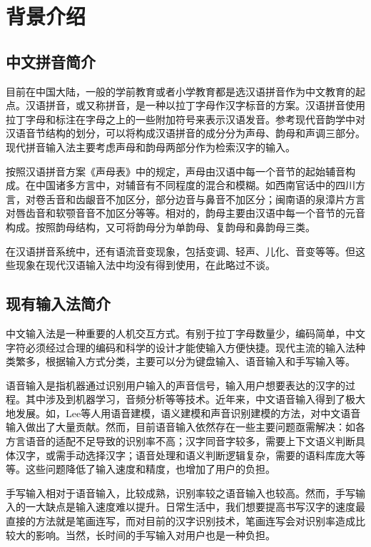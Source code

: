 \chapter{背景介绍}
  \section{中文拼音简介\label{sec:intro}}

  目前在中国大陆，一般的学前教育或者小学教育都是选汉语拼音作为中文教育的起点。汉语拼音，或又称拼音，是一种以拉丁字母作汉字标音的方案。\supercite{wjm}汉语拼音使用拉丁字母和标注在字母之上的一些附加符号来表示汉语发音。参考现代音韵学中对汉语音节结构的划分，可以将构成汉语拼音的成分分为声母、韵母和声调三部分。现代拼音输入法主要考虑声母和韵母两部分作为检索汉字的输入。

  按照汉语拼音方案《声母表》中的规定，声母由汉语中每一个音节的起始辅音构成。在中国诸多方言中，对辅音有不同程度的混合和模糊。如西南官话中的四川方言，对卷舌音和齿龈音不加区分，部分边音与鼻音不加区分；闽南语的泉漳片方言对唇齿音和软颚音音不加区分等等。\supercite{jdp}相对的，韵母主要由汉语中每一个音节的元音构成。按照韵母结构，又可将韵母分为单韵母、复韵母和鼻韵母三类。

  在汉语拼音系统中，还有语流音变现象，包括变调、轻声、儿化、音变等等。但这些现象在现代汉语输入法中均没有得到使用，在此略过不谈。

  \section{现有输入法简介\label{sec:current_input}}

  中文输入法是一种重要的人机交互方式。有别于拉丁字母数量少，编码简单，中文字符必须经过合理的编码和科学的设计才能使输入方便快捷。现代主流的输入法种类繁多，根据输入方式分类，主要可以分为键盘输入、语音输入和手写输入等。

  语音输入是指机器通过识别用户输入的声音信号，输入用户想要表达的汉字的过程。其中涉及到机器学习，音频分析等等技术。近年来，中文语音输入得到了极大地发展。如，Lee等人\supercite{lee5system, lee1997voice, lee1993mandarin}用语音建模，语义建模和声音识别建模的方法，对中文语音输入做出了大量贡献。然而，目前语音输入依然存在一些主要问题亟需解决：如各方言语音的适配不足导致的识别率不高\supercite{chen2000tone}；汉字同音字较多，需要上下文语义判断具体汉字，或需手动选择汉字；语音处理和语义判断逻辑复杂，需要的语料库庞大等等。这些问题降低了输入速度和精度，也增加了用户的负担。

  手写输入相对于语音输入，比较成熟，识别率较之语音输入也较高。然而，手写输入的一大缺点是输入速度难以提升。日常生活中，我们想要提高书写汉字的速度最直接的方法就是笔画连写，而对目前的汉字识别技术，笔画连写会对识别率造成比较大的影响。\supercite{srihari2007offline}当然，长时间的手写输入对用户也是一种负担。

